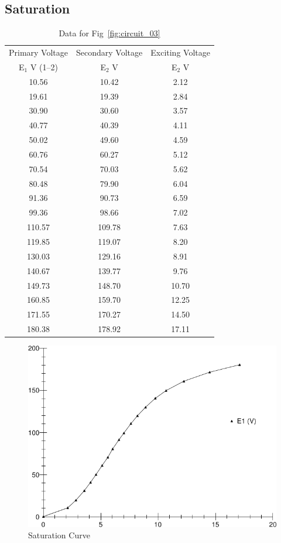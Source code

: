 \documentclass{article}
\begin{document}
\subsection{Saturation}
\begin{table}[H]
  \centering
  \begin{tabular}{ccc}
    \hline
    Primary Voltage & Secondary Voltage & Exciting Voltage\\
    E$_1$ V (1--2) & E$_2$ V & E$_2$ V\\
    \hline
    10.56 &  10.42 &  2.12 \\
    19.61 &  19.39 &  2.84 \\
    30.90 &  30.60 &  3.57 \\
    40.77 &  40.39 &  4.11 \\
    50.02 &  49.60 &  4.59 \\
    60.76 &  60.27 &  5.12 \\
    70.54 &  70.03 &  5.62 \\
    80.48 &  79.90 &  6.04 \\
    91.36 &  90.73 &  6.59 \\
    99.36 &  98.66 &  7.02 \\
    110.57 & 109.78 &  7.63 \\
    119.85 & 119.07 &  8.20 \\
    130.03 & 129.16 &  8.91 \\
    140.67 & 139.77 &  9.76 \\
    149.73 & 148.70 & 10.70 \\
    160.85 & 159.70 & 12.25 \\
    171.55 & 170.27 & 14.50 \\
    180.38 & 178.92 & 17.11 \\
  \end{tabular}
  \caption{Data for Fig~\ref{fig:circuit_03}}
  \label{tab:circuit_3}
\end{table}

\begin{figure}[H]
  \centering
  \includegraphics[width=.8\textwidth]{img/graph}
  \caption{Saturation Curve}
  \label{fig:graph}
\end{figure}
\end{document}
